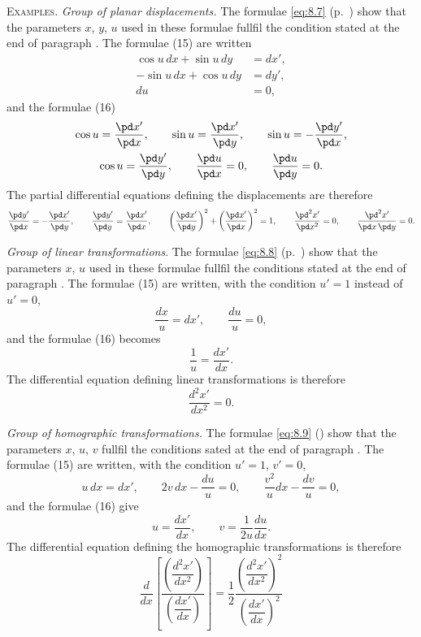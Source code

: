 {\small

\textsc{Examples.} \emph{Group of planar displacements.} The formulae \eqref{eq:8.7} (p.~\pageref{eq:8.7}) show that the parameters $x$, $y$, $u$ used in these formulae fullfil the condition stated at the end of paragraph . The formulae (15) are written
\begin{align*}
  \cos u\,dx+\sin u\,dy&=dx',\\
  -\sin u\,dx+\cos u\,dy&=dy',\\
  du&=0,
\end{align*}
and the formulae (16)
\begin{gather*}
  \cos u=\frac{\pd x'}{\pd x},\qquad\sin u=\frac{\pd x'}{\pd y},\qquad \sin u=-\frac{\pd y'}{\pd x},\\
  \cos u=\frac{\pd y'}{\pd y},\qquad\frac{\pd u}{\pd x}=0,\qquad\frac{\pd u}{\pd y}=0.
\end{gather*}
The partial differential equations defining the displacements are therefore
\[
\frac{\pd y'}{\pd x}=-\frac{\pd x'}{\pd y},\qquad\frac{\pd y'}{\pd y}=\frac{\pd x'}{\pd x},\qquad\left(\frac{\pd x'}{\pd y}\right)^{2}+\left(\frac{\pd x'}{\pd x}\right)^{2}=1,\qquad\frac{\pd ^{2}x'}{\pd x^{2}}=0,\qquad\frac{\pd^{2}x'}{\pd x\,\pd y}=0.
\]

\somespace

\emph{Group of linear transformations}. The formulae \eqref{eq:8.8} (p.~\pageref{eq:8.8}) show that the parameters $x$, $u$ used in these formulae fullfil the conditions stated at the end of paragraph . The formulae (15) are written, with the condition $u'=1$ instead of $u'=0$,
\[
\frac{dx}{u}=dx',\qquad\frac{du}{u}=0,
\]
and the formulae (16) becomes
\[
\frac{1}{u}=\frac{dx'}{dx}.
\]
The differential equation defining linear transformations is therefore
\[
\frac{d^{2}x'}{dx^{2}}=0.
\]

\somespace

\emph{Group of homographic transformations.} The formulae \eqref{eq:8.9} (\pageref{eq:8.9}) show that the parameters $x$, $u$, $v$ fullfil the conditions sated at the end of paragraph . The formulae (15) are written, with the condition $u'=1$, $v'=0$,
\[
u\,dx=dx',\qquad 2v\,dx-\frac{du}{u}=0,\qquad\frac{v^{2}}{u}dx-\frac{dv}{u}=0,
\]
and the formulae (16) give
\[
u=\frac{dx'}{dx},\qquad v=\frac{1}{2u}\frac{du}{dx}.
\]
The differential equation defining the homographic transformations is therefore
\[
\frac{d}{dx}\left[\frac{\left(\dfrac{d^{2}x'}{dx^{2}}\right)}{\left(\dfrac{dx'}{dx}\right)}\right]=\frac{1}{2}\frac{\left(\dfrac{d^{2}x'}{dx^{2}}\right)^{2}}{\left(\dfrac{dx'}{dx}\right)^{2}}
\]
}

